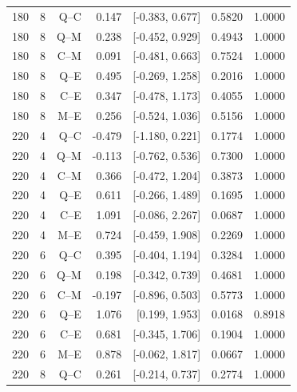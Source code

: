 \begin{longtable}{@{}lrrrrrr@{}}
180 & 8 & Q--C & 0.147 & [-0.383, 0.677] & 0.5820 & 1.0000\\

180 & 8 & Q--M & 0.238 & [-0.452, 0.929] & 0.4943 & 1.0000\\

180 & 8 & C--M & 0.091 & [-0.481, 0.663] & 0.7524 & 1.0000\\

180 & 8 & Q--E & 0.495 & [-0.269, 1.258] & 0.2016 & 1.0000\\

180 & 8 & C--E & 0.347 & [-0.478, 1.173] & 0.4055 & 1.0000\\

180 & 8 & M--E & 0.256 & [-0.524, 1.036] & 0.5156 & 1.0000\\

220 & 4 & Q--C & -0.479 & [-1.180, 0.221] & 0.1774 & 1.0000\\

220 & 4 & Q--M & -0.113 & [-0.762, 0.536] & 0.7300 & 1.0000\\

220 & 4 & C--M & 0.366 & [-0.472, 1.204] & 0.3873 & 1.0000\\

220 & 4 & Q--E & 0.611 & [-0.266, 1.489] & 0.1695 & 1.0000\\

220 & 4 & C--E & 1.091 & [-0.086, 2.267] & 0.0687 & 1.0000\\

220 & 4 & M--E & 0.724 & [-0.459, 1.908] & 0.2269 & 1.0000\\

220 & 6 & Q--C & 0.395 & [-0.404, 1.194] & 0.3284 & 1.0000\\

220 & 6 & Q--M & 0.198 & [-0.342, 0.739] & 0.4681 & 1.0000\\

220 & 6 & C--M & -0.197 & [-0.896, 0.503] & 0.5773 & 1.0000\\

220 & 6 & Q--E & 1.076 & [0.199, 1.953] & 0.0168 & 0.8918\\

220 & 6 & C--E & 0.681 & [-0.345, 1.706] & 0.1904 & 1.0000\\

220 & 6 & M--E & 0.878 & [-0.062, 1.817] & 0.0667 & 1.0000\\

220 & 8 & Q--C & 0.261 & [-0.214, 0.737] & 0.2774 & 1.0000\\


\end{longtable}

